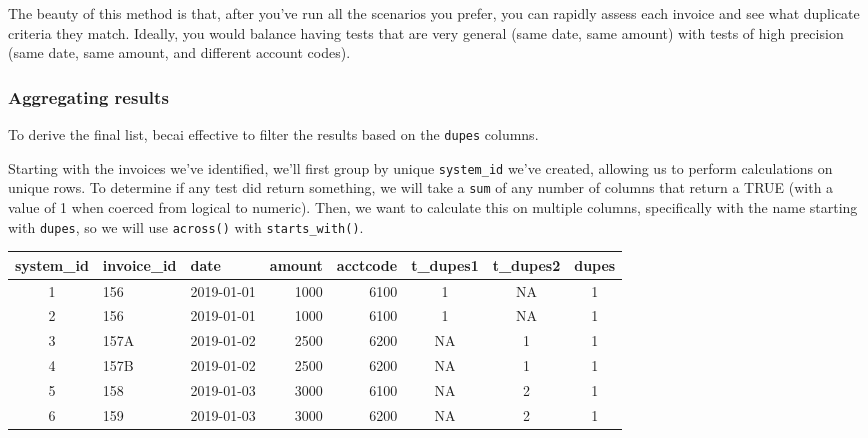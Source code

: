 \documentclass[
]{book}
\newenvironment{Shaded}{\begin{snugshade}}{\end{snugshade}}
\newcommand{\DataTypeTok}[1]{\textcolor[rgb]{0.13,0.29,0.53}{#1}}
\newcommand{\DecValTok}[1]{\textcolor[rgb]{0.00,0.00,0.81}{#1}}
\newcommand{\KeywordTok}[1]{\textcolor[rgb]{0.13,0.29,0.53}{\textbf{#1}}}
\newcommand{\NormalTok}[1]{#1}
\newcommand{\OperatorTok}[1]{\textcolor[rgb]{0.81,0.36,0.00}{\textbf{#1}}}
\newcommand{\OtherTok}[1]{\textcolor[rgb]{0.56,0.35,0.01}{#1}}
\newcommand{\StringTok}[1]{\textcolor[rgb]{0.31,0.60,0.02}{#1}}
\begin{document}
The beauty of this method is that, after you've run all the scenarios you prefer, you can rapidly assess each invoice and see what duplicate criteria they match. Ideally, you would balance having tests that are very general (same date, same amount) with tests of high precision (same date, same amount, and different account codes).

\hypertarget{aggregating-results}{%
\subsubsection{Aggregating results}\label{aggregating-results}}

To derive the final list, becai effective to filter the results based on the \texttt{dupes} columns.

Starting with the invoices we've identified, we'll first group by unique \texttt{system\_id} we've created, allowing us to perform calculations on unique rows. To determine if any test did return something, we will take a \texttt{sum} of any number of columns that return a TRUE (with a value of 1 when coerced from logical to numeric). Then, we want to calculate this on multiple columns, specifically with the name starting with \texttt{dupes}, so we will use \texttt{across()} with \texttt{starts\_with()}.

\begin{Shaded}
\end{Shaded}

\captionsetup[table]{labelformat=empty,skip=1pt}
\begin{longtable}{cllrrccc}
\toprule
system\_id & invoice\_id & date & amount & acctcode & t\_dupes1 & t\_dupes2 & dupes \\ 
\midrule
1 & 156 & 2019-01-01 & 1000 & 6100 & 1 & NA & 1 \\ 
2 & 156 & 2019-01-01 & 1000 & 6100 & 1 & NA & 1 \\ 
3 & 157A & 2019-01-02 & 2500 & 6200 & NA & 1 & 1 \\ 
4 & 157B & 2019-01-02 & 2500 & 6200 & NA & 1 & 1 \\ 
5 & 158 & 2019-01-03 & 3000 & 6100 & NA & 2 & 1 \\ 
6 & 159 & 2019-01-03 & 3000 & 6200 & NA & 2 & 1 \\ 
\bottomrule
\end{longtable}
\end{document}
